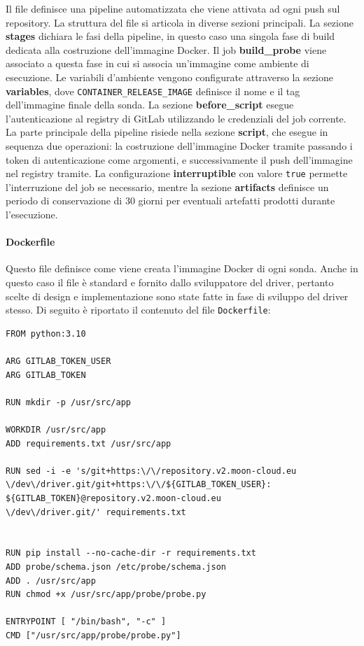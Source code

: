 Il file definisce una pipeline automatizzata che viene attivata ad ogni push sul repository. La struttura del file si articola in diverse sezioni principali.
La sezione \textbf{stages} dichiara le fasi della pipeline, in questo caso una singola fase di build dedicata alla costruzione dell'immagine Docker. Il job \textbf{build\_probe} viene associato a questa fase in cui si associa un'immagine come ambiente di esecuzione.
Le variabili d'ambiente vengono configurate attraverso la sezione \textbf{variables}, dove \texttt{CONTAINER\_RELEASE\_IMAGE} definisce il nome e il tag dell'immagine finale della sonda. La sezione \textbf{before\_script} esegue l'autenticazione al registry di GitLab utilizzando le credenziali del job corrente.
La parte principale della pipeline risiede nella sezione \textbf{script}, che esegue in sequenza due operazioni: la costruzione dell'immagine Docker tramite passando i token di autenticazione come argomenti, e successivamente il push dell'immagine nel registry tramite. La configurazione \textbf{interruptible} con valore \texttt{true} permette l'interruzione del job se necessario, mentre la sezione \textbf{artifacts} definisce un periodo di conservazione di 30 giorni per eventuali artefatti prodotti durante l'esecuzione.

\paragraph{Dockerfile} Questo file definisce come viene creata l'immagine Docker di ogni sonda. Anche in questo caso il file è standard e fornito dallo sviluppatore del driver, pertanto scelte di design e implementazione sono state fatte in fase di sviluppo del driver stesso. Di seguito è riportato il contenuto del file \texttt{Dockerfile}:

\begin{lstlisting}[style=mydockerfile, caption={\texttt{Dockerfile} per la creazione dell'immagine della sonda}]
FROM python:3.10

ARG GITLAB_TOKEN_USER
ARG GITLAB_TOKEN

RUN mkdir -p /usr/src/app

WORKDIR /usr/src/app 
ADD requirements.txt /usr/src/app 

RUN sed -i -e 's/git+https:\/\/repository.v2.moon-cloud.eu
\/dev\/driver.git/git+https:\/\/${GITLAB_TOKEN_USER}:
${GITLAB_TOKEN}@repository.v2.moon-cloud.eu
\/dev\/driver.git/' requirements.txt


RUN pip install --no-cache-dir -r requirements.txt
ADD probe/schema.json /etc/probe/schema.json
ADD . /usr/src/app
RUN chmod +x /usr/src/app/probe/probe.py

ENTRYPOINT [ "/bin/bash", "-c" ]
CMD ["/usr/src/app/probe/probe.py"]
\end{lstlisting}

